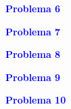 \documentclass[a4paper,12pt]{article}
\newcommand{\printingbibliography}{%

    \pagestyle{myheadings}
    \markright{}
    \sloppy
    \printbibliography[heading=bibintoc, %
                   title=Refer\^encias %
                  ]
    \fussy%
}
\begin{document}
\begin{flushleft}
\textbf{\textcolor{blue}{Problema 6}}\\
\end{flushleft}

\begin{flushleft}
\textbf{\textcolor{blue}{Problema 7}}\\
\end{flushleft}

\begin{flushleft}
\textbf{\textcolor{blue}{Problema 8}}\\
\end{flushleft}
    
\begin{flushleft}
\textbf{\textcolor{blue}{Problema 9}}\\
\end{flushleft}

\begin{flushleft}
\textbf{\textcolor{blue}{Problema 10}}\\
\end{flushleft}

\end{document}
